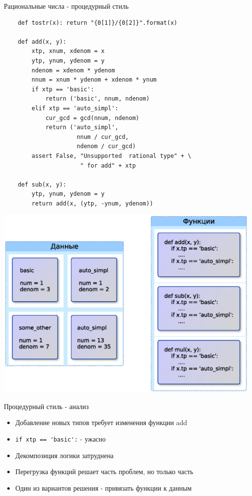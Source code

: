 \documentclass{article}
\begin{document}
\begin{center}Рациональные числа - процедурный стиль\end{center}
\begin{lstlisting}
    def tostr(x): return "{0[1]}/{0[2]}".format(x)

    def add(x, y):
        xtp, xnum, xdenom = x
        ytp, ynum, ydenom = y
        ndenom = xdenom * ydenom
        nnum = xnum * ydenom + xdenom * ynum
        if xtp == 'basic':
            return ('basic', nnum, ndenom)
        elif xtp == 'auto_simpl':
            cur_gcd = gcd(nnum, ndenom)
            return ('auto_simpl', 
                     nnum / cur_gcd, 
                     ndenom / cur_gcd)
        assert False, "Unsupported  rational type" + \
                      " for add" + xtp

    def sub(x, y):
        ytp, ynum, ydenom = y
        return add(x, (ytp, -ynum, ydenom))
\end{lstlisting}
\newpage

\begin{center} \includegraphics{images/procedural_style.eps} \end{center} 
\newpage

\begin{center} Процедурный стиль - анализ \end{center}
\begin{itemize}
    \item Добавление новых типов требует изменения функции add
    \item \lstinline!if xtp == 'basic':! - ужасно
    \item Декомпозиция логики затруднена
    \item Перегрузка функций решает часть проблем, но только часть
    \item Один из вариантов решения - привязать функции к данным
\end{itemize}
\newpage
\end{document}
